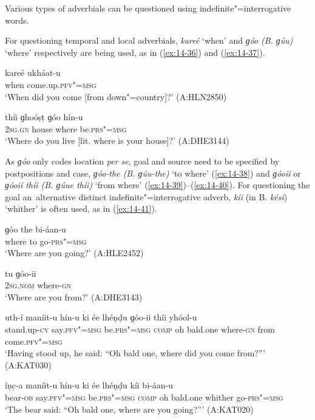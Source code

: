  Various types of adverbials can be questioned using indefinite"=interrogative words.


For questioning temporal and local adverbials, \textit{kareé} `when' and \textit{ɡóo} \textit{(B. ɡúu)} `where' respectively are being used, as in (\ref{ex:14-36}) and (\ref{ex:14-37}). 

\begin{exe}
\ex
\label{ex:14-36}
\gll kareé ukháat-u \\
when come.up.\textsc{pfv"=msg} \\
\glt `When did you come [from down"=country]?' (A:HLN2850)

\ex
\label{ex:14-37}
\gll thíi ɡhoóṣṭ ɡóo hín-u \\
\textsc{2sg.gn} house where be.\textsc{prs"=msg} \\
\glt `Where do you live [lit. where is your house]?' (A:DHE3144)
\end{exe}

As \textit{ɡóo} only codes location \textit{per se}, goal and source need to be specified by postpositions and case, \textit{ɡóo-the (B. ɡúu-the)} `to where' (\ref{ex:14-38}) and \textit{ɡóoii} or \textit{ɡóoii thíi (B. ɡúue thíi)} `from where' (\ref{ex:14-39})--(\ref{ex:14-40}). For questioning the goal an~alternative distinct indefinite"=interrogative adverb, \textit{kíi} (in B. \textit{kési}) `whither' is often used, as in (\ref{ex:14-41}).

\begin{exe}
\ex
\label{ex:14-38}
\gll ɡóo the bi-áan-u \\
where to go-\textsc{prs"=msg } \\
\glt `Where are you going?' (A:HLE2452)

\ex
\label{ex:14-39}
\gll tu ɡóo-ii \\
\textsc{2sg.nom} where-\textsc{gn}  \\
\glt `Where are you from?' (A:DHE3143)

\ex
\label{ex:14-40}
\gll uth-í maníit-u hín-u ki ée  lhéṇḍu ɡóo-ii thíi yhóol-u \\
stand.up-\textsc{cv} say.\textsc{pfv"=msg} be.\textsc{prs"=msg} \textsc{comp} oh bald.one where-\textsc{gn} from come.\textsc{pfv"=msg} \\
\glt `Having stood up, he said: ``Oh bald one, where did you come from?''' (A:KAT030)

\ex
\label{ex:14-41}
\gll íṇc̣-a maníit-u hín-u ki ée lhéṇḍu  kíi bi-áan-u \\
bear-\textsc{ob} say.\textsc{pfv"=msg} be.\textsc{prs"=msg} \textsc{comp} oh bald.one whither go-\textsc{prs"=msg} \\
\glt `The bear said: ``Oh bald one, where are you going?''' (A:KAT020)
\end{exe}

